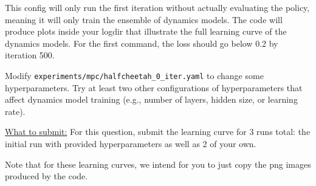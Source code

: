\documentclass{article} %
\begin{document}
This config will only run the first iteration without actually evaluating the policy, meaning it will only train the ensemble of dynamics models. The code will produce plots inside your logdir that illustrate the full learning curve of the dynamics models. For the first command, the loss should go below 0.2 by iteration 500. 

Modify \verb+experiments/mpc/halfcheetah_0_iter.yaml+ to change some hyperparameters. Try at least two other configurations of hyperparameters that affect dynamics model training (e.g., number of layers, hidden size, or learning rate).

\underline{What to submit:} For this question, submit the learning curve for 3 runs total: the initial run with provided hyperparameters as well as 2 of your own. 

Note that for these learning curves, we intend for you to just copy the png images produced by the code.
\end{document}
